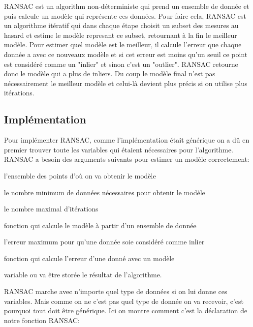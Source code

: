 \documentclass[11pt]{article}
\begin{document}
RANSAC est un algorithm non-déterministe qui prend un ensemble de donnée et puis calcule un modèle qui représente ces données. Pour faire cela, RANSAC est un algorithme itératif qui dans chaque étape choisit un subset des mesures au hasard et estime le modèle represant ce subset, retournant à la fin le meilleur modèle. Pour estimer quel modèle est le meilleur, il calcule l’erreur que chaque donnée a avec ce nouveaux modèle et si cet erreur est moins qu’un seuil ce point est considéré comme un "inlier" et sinon c’est un "outlier". RANSAC retourne donc le modèle qui a plus de inliers.  Du coup le modèle final n’est pas nécessairement le meilleur modèle et celui-là devient plus précis si on utilise plus itérations. 

\subsection{Implémentation}

Pour implémenter RANSAC, comme l'implémentation était générique on a dû en premier trouver toute les variables qui étaient nécessaires pour l’algorithme. \\
RANSAC a besoin des arguments suivants pour estimer un modèle correctement:
\begin{description}[labelindent=16pt,style=multiline,leftmargin=7cm, noitemsep]
	\item[data:] l’ensemble des points d’où on va obtenir le modèle
	\item[minNumberOfDataPoints:] le nombre minimum de données nécessaires pour obtenir le modèle
	\item[maxNumberOfIterations:] le nombre maximal d’itérations
	\item[calculateParameters:] fonction qui calcule le modèle à partir d’un ensemble de donnée
	\item[errorThreshold:] l’erreur maximum pour qu’une donnée soie considéré comme inlier
	\item[calculateError:] fonction qui calcule l’erreur d’une donné avec un modèle
	\item[bestFittingParameters:] variable ou va être storée le résultat de l'algorithme.
\end{description}

\pagebreak

RANSAC marche avec n’importe quel type de données si on lui donne ces variables. Mais comme on ne c’est pas quel type de donnée on va recevoir, c’est pourquoi tout doit être générique. Ici on montre comment c’est la déclaration de notre fonction RANSAC:
\end{document}
